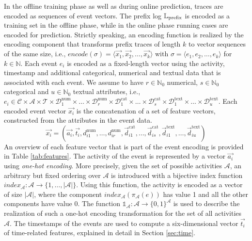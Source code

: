 In the offline training phase as well as during online prediction, traces are encoded as sequences of event vectors.
The prefix log $\mathbb{L}_\mathrm{prefix}$ is encoded as a training set in the offline phase, while in the online phase running cases are encoded for prediction.
Strictly speaking, an encoding function is realized by the encoding component that transforms prefix traces of length $k$ to vector sequences of the same size, i.e., $encode(\sigma) = \langle \vec{x_1}, \vec{x_2}, \dots, \vec{x_k}\rangle$ with $\sigma = \langle e_1, e_2, \dots, e_k\rangle$ for $k \in \mathbb{N}$.
Each event $e_i$ is encoded as a fixed-length vector using the activity, timestamp and additional categorical, numerical and textual data that is associated with each event.
We assume to have $r \in \mathbb{N}_0$ numerical, $s \in \mathbb{N}_0$ categorical and $u \in \mathbb{N}_0$ textual attributes, i.e., $e_i \in \mathcal{C} \times \mathcal{A}  \times \mathcal{T} \times \mathcal{D}_1^\mathrm{num} \times \dots \times \mathcal{D}_r^\mathrm{num}   \times \mathcal{D}_1^\mathrm{cat}  \times  \dots  \times \mathcal{D}_s^\mathrm{cat}   \times \mathcal{D}_1^\mathrm{text}   \times \dots  \times \mathcal{D}_u^\mathrm{text}$.
Each encoded event vector $\vec{x_i}$ is the concatenation of a set of feature vectors, constructed from the attributes in the event data.
\begin{equation*}
\vec{x_i}=(
\vec{a_i},
\vec{t_i},
d_{i1}^\mathrm{num}, \dots, d_{ir}^\mathrm{num},
\vec{d}_{i1}^\mathrm{cat}, \dots,\vec{d}_{is}^\mathrm{cat},
\vec{d}_{i1}^\mathrm{text}, \dots, \vec{d}_{iu}^\mathrm{text})
\end{equation*}
An overview of each feature vector that is part of the event encoding is provided in Table \ref{tab:features}.
The activity of the event is represented by a vector $\vec{a_i}$ using \textit{one-hot encoding}.
More precisely, given the set of possible activities $\mathcal{A}$, an arbitrary but fixed ordering over $\mathcal{A}$ is introduced with a bijective index function $index_\mathcal{A} \colon \mathcal{A} \to \{1, \dots, |\mathcal{A}|\}$.
Using this function, the activity is encoded as a vector of size $|\mathcal{A}|$, where the component $index_\mathcal{A}(\pi_\mathcal{A}(e))$ has value 1 and all the other components have value 0.
The function $\mathds{1}_\mathcal{A}\colon \mathcal{A} \to \{0,1\}^\mathcal{A}$ is used to describe the realization of such a one-hot encoding transformation for the set of all activities $\mathcal{A}$.
The timestamps of the events are used to compute a six-dimensional vector $\vec{t_i}$ of time-related features, explained in detail in Section \ref*{sec:time}.

